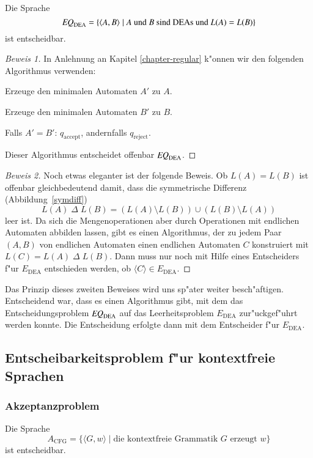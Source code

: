 \begin{satz}
\label{satz:eqdea}
Die Sprache
\[
\text{\it EQ}_{\text{DEA}}=\{
\langle A,B\rangle\;|\;\text{$A$ und $B$ sind DEAs und $L(A)=L(B)$}
\}
\]
%
ist entscheidbar.
\end{satz}

\begin{proof}[Beweis 1]
In Anlehnung an Kapitel \ref{chapter-regular} k"onnen wir den folgenden
Algorithmus verwenden:
\medskip
\begin{compactenum}
\item Erzeuge den minimalen Automaten $A'$ zu $A$.
\item Erzeuge den minimalen Automaten $B'$ zu $B$.
\item Falls $A'=B'$: $q_{\text{accept}}$, andernfalls $q_{\text{reject}}$.
\end{compactenum}
\medskip
Dieser Algorithmus entscheidet offenbar 
$\text{\it EQ}_{\text{DEA}}$.
\end{proof}

\begin{proof}[Beweis 2]
Noch etwas eleganter ist der folgende Beweis.
Ob $L(A)=L(B)$ ist
offenbar gleichbedeutend damit, dass die symmetrische Differenz
(Abbildung~\ref{symdiff})
\[
L(A){\;\Delta\;} L(B)=
(L(A)\setminus L(B)) \cup (L(B)\setminus L(A))
\]
leer ist.
Da sich die Mengenoperationen aber durch Operationen mit
endlichen Automaten abbilden lassen, gibt es einen Algorithmus,
der  zu jedem Paar $(A,B)$
von endlichen Automaten  einen endlichen Automaten $C$ konstruiert mit
$L(C)=L(A){\;\Delta\;} L(B)$.
Dann muss nur noch mit Hilfe eines Entscheiders
f"ur $E_{\text{DEA}}$ entschieden werden, ob $\langle C\rangle\in
E_{\text{DEA}}$.
\end{proof}

Das Prinzip dieses zweiten Beweises wird uns sp"ater weiter besch"aftigen.
Entscheidend war, dass es einen Algorithmus gibt, mit dem das
Entscheidungsproblem 
$\text{\it EQ}_{\text{DEA}}$
auf das Leerheitsproblem
$E_{\text{DEA}}$ zur"uckgef"uhrt werden konnte.
Die Entscheidung erfolgte dann mit dem Entscheider f"ur
$E_{\text{DEA}}$.

\subsection{Entscheibarkeitsproblem f"ur kontextfreie Sprachen}
\subsubsection{Akzeptanzproblem}
%
\begin{satz}
\label{satz:acfg-entscheidbar}
Die Sprache
\[
A_{\text{CFG}}=\{
\langle G,w\rangle\;|\; \text{die kontextfreie Grammatik $G$ erzeugt $w$}
\}
\]
ist entscheidbar.
%
\end{satz}

